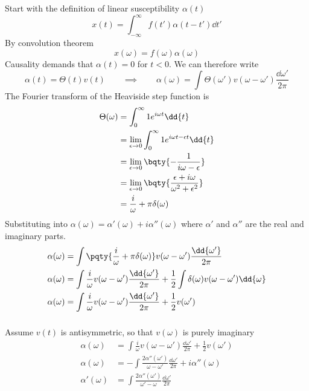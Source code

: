 \documentclass[12pt]{article}
\begin{document}
    \subsection{} Start with the definition of linear susceptibility \(\alpha(t)\) \[
        x(t) = \int_{ - \infty}^{\infty} f(t') \alpha(t - t') \dd{t'}
    \]
    By convolution theorem \[
        x(\omega) = f(\omega) \alpha(\omega)
    \]
    Causality demands that \(\alpha(t) = 0\) for \(t < 0\). We can therefore write \[
        \alpha(t) = \Theta (t) v(t) \qquad \implies \qquad \alpha(\omega) = \int \Theta (\omega') v(\omega - \omega') \frac{\dd{\omega'}}{2\pi} 
    \]
    The Fourier transform of the Heaviside step function is \begin{align*}
        \Theta (\omega) &=\int_{ 0}^{\infty} 1 e^{i\omega t} \dd{t}\\
        &=\lim_{\epsilon \to 0}\int_{ 0}^{\infty} 1 e^{i\omega t - \epsilon t} \dd{t}\\
        &=\lim_{\epsilon \to 0}\bqty{ -\frac{1}{i\omega - \epsilon}}\\
        &=\lim_{\epsilon \to 0}\bqty{ \frac{\epsilon + i\omega}{\omega^2 + \epsilon^2}}\\
        &= \frac{i}{\omega} + \pi \delta(\omega) 
    \end{align*}
    Substituting into \(\alpha(\omega) = \alpha'(\omega) + i \alpha''(\omega)\) where \(\alpha'\) and \(\alpha''\) are the real and imaginary parts.
    \begin{align*}
        \alpha(\omega) &=  \int \pqty{\frac{i}{\omega} + \pi \delta(\omega) } v(\omega - \omega') \frac{\dd{\omega'}}{2\pi}\\
        \alpha(\omega) &=  \int \frac{i}{\omega}  v(\omega - \omega') \frac{\dd{\omega'}}{2\pi} + \frac{1}{2}\int  \delta(\omega) v(\omega - \omega') \dd{\omega}\\
        \alpha(\omega) &=  \int \frac{i}{\omega}  v(\omega - \omega') \frac{\dd{\omega'}}{2\pi} + \frac{1}{2} v(\omega ')
    \end{align*}
    \subsubsection{} Assume \(v(t)\) is antisymmetric, so that \(v(\omega)\) is purely imaginary \begin{align*}
        \alpha(\omega) &=  \int \frac{i}{\omega}  v(\omega - \omega') \frac{\dd{\omega'}}{2\pi} + \frac{1}{2} v(\omega ')\\
        \alpha(\omega) &=  -\int \frac{2\alpha''(\omega ')}{\omega - \omega'}   \frac{\dd{\omega'}}{2\pi} + i\alpha''(\omega)\\
        \alpha'(\omega) &= \int \frac{2\alpha''(\omega ')}{\omega' - \omega}   \frac{\dd{\omega'}}{2\pi}
    \end{align*}
\end{document}
